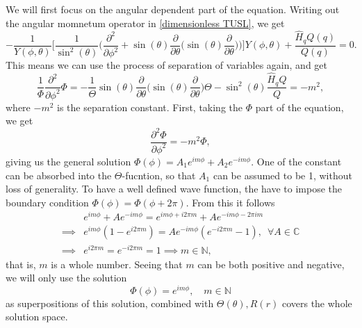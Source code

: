 \documentclass{article}
\begin{document}
        We will first focus on the angular dependent part of the equation. Writing out the angular momnetum operator in \eqref{dimensionless TUSL}, we get
        \begin{equation*}
            -\frac{1}{Y(\phi, \theta)}\bigg[\frac{1}{\sin^2(\theta)}\bigg(\frac{\partial^2}{\partial \phi^2} + \sin(\theta)\frac{\partial}{\partial \theta}\bigg( \sin(\theta) \frac{\partial}{\partial \theta}\bigg) \bigg)\bigg] Y(\phi, \theta) + \frac{\hat H_q Q(q)}{Q(q)} = 0.
        \end{equation*}
        This means we can use the process of separation of variables again, and get
        \begin{equation}
            \label{separated angular eq}
            \frac{1}{\Phi} \frac{\partial^2}{\partial \phi^2} \Phi = - \frac{1}{\Theta}\sin(\theta)\frac{\partial}{\partial \theta}\bigg( \sin(\theta)\frac{\partial}{\partial \theta}\bigg) \Theta -\sin^2(\theta) \frac{\hat H_q Q}{Q}= -m^2,
        \end{equation}
        where \(-m^2\) is the separation constant. First, taking the \(\Phi\) part of the equation, we get
        \begin{equation*}
            \frac{\partial^2 \Phi}{\partial \phi^2} = -m^2 \Phi,
        \end{equation*}
        giving us the general solution \(\Phi(\phi) = A_1 e^{im\phi} + A_2 e^{-im\phi}\). One of the constant can be absorbed into the \(\Theta\)-fucntion, so that \(A_1\) can be assumed to be 1, without loss of generality. To have a well defined wave function, the have to impose the boundary condition \(\Phi(\phi) = \Phi(\phi + 2 \pi)\). From this it follows
        \begin{align*}
            & e^{im\phi}+ Ae^{-im\phi} = e^{im\phi + i2\pi m}+ Ae^{-im\phi - 2\pi i m} \\
            \implies & e^{i m\phi}(1 - e^{i2\pi m}) = Ae^{-i m \phi}(e^{-i2\pi m} - 1), \,\,\, \forall A \in \mathbb{C} \\
            \implies &e^{i2\pi m} = e^{-i2\pi m} = 1 \implies m \in \mathbb{N},
        \end{align*}
        that is, \(m\) is a whole number. Seeing that \(m\) can be both positive and negative, we will only use the solution
        \begin{equation*}
            \Phi(\phi) = e^{im\phi}, \quad m \in \mathbb{N}
        \end{equation*}
        as superpositions of this solution, combined with \(\Theta(\theta), R(r)\) covers the whole solution space.
\end{document}
